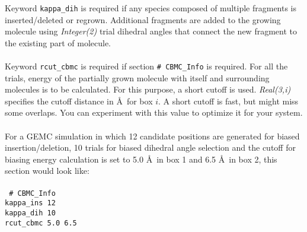 %
Keyword {\tt kappa\_dih} is required
if any species composed of multiple fragments is inserted/deleted or regrown.
Additional fragments are added to the growing molecule
using {\it Integer(2)} trial dihedral angles that connect the new fragment to the existing part of molecule. \\ \\
%
Keyword {\tt rcut\_cbmc} is required if section {\tt \# CBMC\_Info} is required.
For all the trials, energy of the partially grown molecule with itself and surrounding molecules is to be calculated.
For this purpose, a short cutoff is used. {\it Real(3,i)} specifies the cutoff distance in \AA\ for box $i$.
A short cutoff is fast, but might miss some overlaps. You can experiment with this value to optimize it for your system.\\ \\
%
For a GEMC simulation in which 12 candidate positions are generated for biased insertion/deletion, 10 trials for
biased dihedral angle selection and the cutoff for biasing energy calculation is set to 5.0 \AA\ in box 1 and 6.5 \AA\
in box 2, this section would look like: \\ \\
%
\texttt{
\# CBMC\_Info \\
kappa\_ins   12 \\
kappa\_dih   10 \\
rcut\_cbmc   5.0 6.5}
%
%
%
